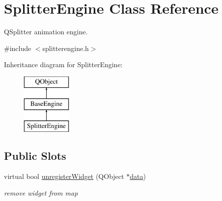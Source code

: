 \hypertarget{class_splitter_engine}{}\section{Splitter\+Engine Class Reference}
\label{class_splitter_engine}


Q\+Splitter animation engine.  




{\ttfamily \#include $<$splitterengine.\+h$>$}

Inheritance diagram for Splitter\+Engine\+:\begin{figure}[H]
\begin{center}
\leavevmode
\includegraphics[height=3.000000cm]{class_splitter_engine}
\end{center}
\end{figure}
\subsection*{Public Slots}
\begin{DoxyCompactItemize}
\item 
\mbox{\label{class_splitter_engine_a5bac5b455d9454a4140e40b36990e8d1}} 
virtual bool \hyperlink{class_splitter_engine_a5bac5b455d9454a4140e40b36990e8d1}{unregister\+Widget} (Q\+Object $\ast$\hyperlink{class_splitter_engine_a2bb7aee79b0dca300c30c619c1a8a20a}{data})
\begin{DoxyCompactList}\small\item\em remove widget from map \end{DoxyCompactList}\end{DoxyCompactItemize}
